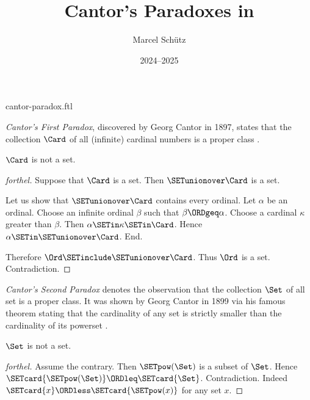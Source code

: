 \documentclass{stex}
\title{Cantor's Paradoxes in \Naproche}
\author{Marcel Schütz}
\date{2024--2025}
\begin{document}
\begin{smodule}{cantor-paradox.ftl}
\maketitle


\noindent \emph{Cantor's First Paradox}, discovered by Georg Cantor in 1897,
states that the collection $\Card$ of all (infinite) cardinal numbers is a
proper class \cite[chapter 156]{Cantor1991}.

\begin{theorem}[forthel,title=Cantor's First Paradox,id=cantor_paradox_1]
  $\Card$ is not a set.
\end{theorem}
\begin{proof}[forthel]
  Suppose that $\Card$ is a set.
  Then $\SETunionover \Card$ is a set.

  Let us show that $\SETunionover \Card$ contains every ordinal.
    Let $\alpha$ be an ordinal.
    Choose an infinite ordinal $\beta$ such that $\beta \ORDgeq \alpha$.
    Choose a cardinal $\kappa$ greater than $\beta$.
    Then $\alpha \SETin \kappa \SETin \Card$.
    Hence $\alpha \SETin \SETunionover \Card$.
  End.

  Therefore $\Ord \SETinclude \SETunionover \Card$.
  Thus $\Ord$ is a set.
  Contradiction.
\end{proof}

\emph{Cantor's Second Paradox} denotes the observation that the collection
$\Set$ of all set is a proper class.
It was shown by Georg Cantor in 1899 via his famous theorem stating that the
cardinality of any set is strictly smaller than the cardinality of its 
powerset \cite[chapter 163]{Cantor1991}.

\begin{theorem}[forthel,title=Cantor's Second Paradox,id=cantor_paradox_2]
  $\Set$ is not a set.
\end{theorem}
\begin{proof}[forthel]
  Assume the contrary.
  Then $\SETpow(\Set)$ is a subset of $\Set$.
  Hence $\SETcard{\SETpow(\Set)} \ORDleq \SETcard{\Set}$.
  Contradiction.
  Indeed $\SETcard{x} \ORDless \SETcard{\SETpow(x)}$ for any set $x$.
\end{proof}

\printbibliography
{}
\end{smodule}
\end{document}
